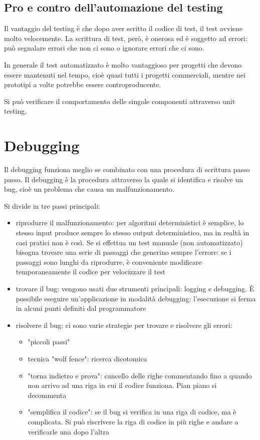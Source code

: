 \subsection{Pro e contro dell'automazione del testing}
Il vantaggio del testing è che dopo aver scritto il codice di test, il test avviene molto velocemente. 
La scrittura di test, però, è onerosa ed è soggetto ad errori: può segnalare errori che non ci sono o ignorare errori che ci sono. 

In generale il test automatizzato è molto vantaggioso per progetti che devono essere mantenuti nel tempo, cioè quasi tutti i progetti commerciali, mentre nei prototipi a volte potrebbe essere controproducente. 

Si può verificare il comportamento delle singole componenti attraverso unit testing. 

\section{Debugging}
Il debugging funziona meglio se combinato con una procedura di scrittura passo passo. 
Il debugging è la procedura attraverso la quale si identifica e risolve un bug, cioè un problema che causa un malfunzionamento.

Si divide in tre passi principali:
\begin{itemize}
    \item riprodurre il malfunzionamento: per algoritmi deterministici è semplice, lo stesso input produce sempre lo stesso output deterministico, ma in realtà in casi pratici non è così. Se si effettua un test manuale (non automatizzato) bisogna trovare una serie di passaggi che generino sempre l'errore: se i passaggi sono lunghi da riprodurre, è conveniente modificare temporaneamente il codice per velocizzare il test
    \item trovare il bug: vengono usati due strumenti principali: logging e debugging. È possibile eseguire un'applicazione in modalità debugging: l'esecuzione si ferma in alcuni punti definiti dal programmatore
    \item risolvere il bug: ci sono varie strategie per trovare e risolvere gli errori:
    \begin{itemize}
        \item "piccoli passi"
        \item tecnica "wolf fence": ricerca dicotomica
        \item "torna indietro e prova": cancello delle righe commentando fino a quando non arrivo ad una riga in cui il codice funziona. Pian piano si decommenta
        \item "semplifica il codice": se il bug si verifica in una riga di codice, ma è complicata. Si può riscrivere la riga di codice in più righe e andare a verificarle una dopo l'altra
    \end{itemize}
\end{itemize}


